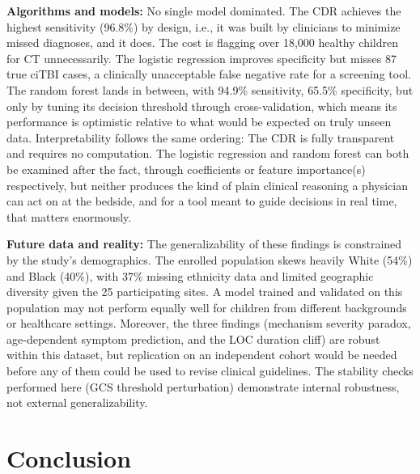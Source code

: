 \documentclass[11pt,letterpaper]{article}
\begin{document}
\textbf{Algorithms and models:} No single model dominated. The CDR achieves the highest sensitivity (96.8\%) by design, i.e., it was built by clinicians to minimize missed diagnoses, and it does. The cost is flagging over 18,000 healthy children for CT unnecessarily. The logistic regression improves specificity but misses 87 true ciTBI cases, a clinically unacceptable false negative rate for a screening tool. The random forest lands in between, with 94.9\% sensitivity, 65.5\% specificity, but only by tuning its decision threshold through cross-validation, which means its performance is optimistic relative to what would be expected on truly unseen data. Interpretability follows the same ordering: The CDR is fully transparent and requires no computation. The logistic regression and random forest can both be examined after the fact, through coefficients or feature importance(s) respectively, but neither produces the kind of plain clinical reasoning a physician can act on at the bedside, and for a tool meant to guide decisions in real time, that matters enormously.

\textbf{Future data and reality:} The generalizability of these findings is constrained by the study's demographics. The enrolled population skews heavily White (54\%) and Black (40\%), with 37\% missing ethnicity data and limited geographic diversity given the 25 participating sites. A model trained and validated on this population may not perform equally well for children from different backgrounds or healthcare settings. Moreover, the three findings (mechanism severity paradox, age-dependent symptom prediction, and the LOC duration cliff) are robust within this dataset, but replication on an independent cohort would be needed before any of them could be used to revise clinical guidelines. The stability checks performed here (GCS threshold perturbation) demonstrate internal robustness, not external generalizability.

\section{Conclusion}\label{conclusion}
\end{document}
